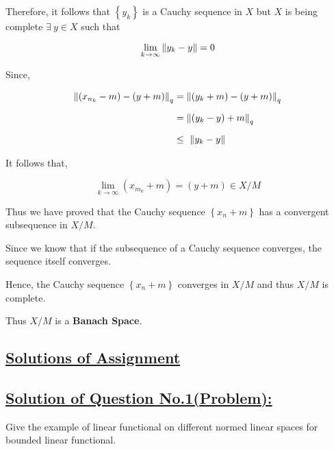 \documentclass[a4paper,12pt]{article}
\begin{document}
    Therefore, it follows that $\left\{y_k\right\}$ is a Cauchy sequence in $X$ but $X$ is being complete $\exists\ y\in X$ such that
    
    \[\lim_{k\to \infty} \norm{y_k - y} = 0\]

    Since, 

    \begin{equation*}
        \begin{split}
            \norm{(x_{n_k} - m) - (y + m)}_q & = \norm{(y_k + m) - (y + m)}_q\\[2mm]
            & = \norm{(y_k - y) + m}_q\\[2mm]
            & \leq\ \norm{y_k -y}
        \end{split}
    \end{equation*}

    \begin{center}
        It follows that,
    \end{center}
    
    \[\lim_{k\to \infty} ( x_{m_k} + m) = (y + m)\in X/M\]

    \vspace*{0.4cm}

    Thus we have proved that the Cauchy sequence $\left\{x_n + m\right\}$ has a convergent subsequence in $X/M$.
    
    Since we know that if the subsequence of a Cauchy sequence converges, the sequence itself converges.

    Hence, the Cauchy sequence $\left\{x_n + m\right\}$ converges in $X/M$ and thus $X/M$ is complete.

    Thus $X/M$ is a {\bf Banach Space}.

    \pagebreak

    \begin{center}
        \section*{\underline{\LARGE{{\bf Solutions of Assignment }}}}
    \end{center}

    \subsection*{\underline{Solution of Question No.1(Problem):}}

    \begin{tcolorbox}[title=Problem]
        Give the example of linear functional on different normed linear spaces for bounded linear functional.
    \end{tcolorbox}
\end{document}
